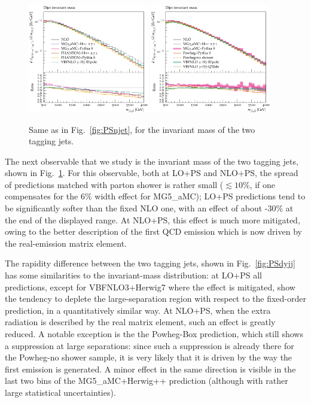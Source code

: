 \begin{figure}[hbt]
\centering
\includegraphics[width=0.47\textwidth]{figures/LOPS/m_jj.pdf}
\includegraphics[width=0.47\textwidth]{figures/NLOPS/m_jj.pdf}
\caption{Same as in Fig.~\protect\ref{fig:PSnjet}, for the invariant mass of the two tagging jets.}
\label{fig:PSmjj}
\end{figure}

The next observable that we study is the invariant mass of the two tagging jets, shown in Fig.~\ref{fig:PSmjj}. For this observable, both at LO+PS and NLO+PS,
the spread of predictions matched with parton shower is rather small
($\lesssim 10\%$, if one compensates for the 6\% width effect for {\sc MG5\_aMC}); LO+PS predictions tend to be significantly softer than the fixed NLO one, with an effect of
about -30\% at the end of the displayed range. At NLO+PS, this effect is much more mitigated, owing to the better description of the first QCD emission which is now driven by the real-emission matrix element.
 
The rapidity difference between the two tagging jets, shown in Fig.~\ref{fig:PSdyjj} has some similarities to the invariant-mass distribution: at LO+PS all predictions,
except for {\sc VBFNLO3+Herwig7} where the effect is mitigated, show the tendency to deplete the large-separation region with respect to the fixed-order prediction, in a
quantitatively similar way. At NLO+PS, when the extra radiation is described by the real matrix element, such an effect is greatly reduced. A notable
exception is the the {\sc Powheg-Box} prediction, which still shows a suppression at large separations: since such a suppression is already there for the {\sc Powheg-no shower} sample,
it is very likely that it is driven by the way the first emission is generated. A minor effect in the same direction is visible in the last two bins of the
{\sc MG5\_aMC+Herwig++} prediction (although with rather large statistical uncertainties).



